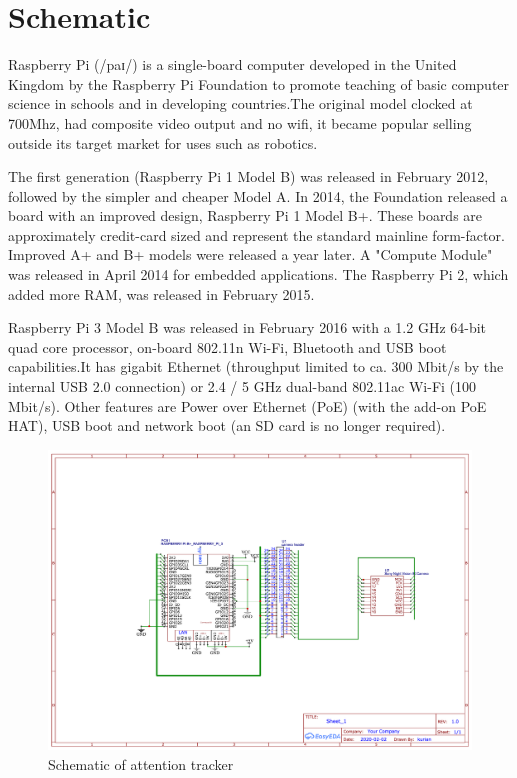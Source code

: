 \section{Schematic}

Raspberry Pi (/paɪ/) is a single-board computer developed in the United Kingdom by the Raspberry Pi Foundation to promote teaching of basic computer science in schools and in developing countries.The original model clocked at 700Mhz, had composite video output and no wifi, it became popular selling outside its target market for uses such as robotics. 

The first generation (Raspberry Pi 1 Model B) was released in February 2012, followed by the simpler and cheaper Model A. In 2014, the Foundation released a board with an improved design, Raspberry Pi 1 Model B+. These boards are approximately credit-card sized and represent the standard mainline form-factor. Improved A+ and B+ models were released a year later. A "Compute Module" was released in April 2014 for embedded applications. The Raspberry Pi 2, which added more RAM, was released in February 2015.

Raspberry Pi 3 Model B was released in February 2016 with a 1.2 GHz 64-bit quad core processor, on-board 802.11n Wi-Fi, Bluetooth and USB boot capabilities.It has gigabit Ethernet (throughput limited to ca. 300 Mbit/s by the internal USB 2.0 connection) or 2.4 / 5 GHz dual-band 802.11ac Wi-Fi (100 Mbit/s). Other features are Power over Ethernet (PoE) (with the add-on PoE HAT), USB boot and network boot (an SD card is no longer required).
\begin{figure}[ht]
\centering
\includegraphics[scale=0.15]{project}
\caption{Schematic of attention tracker}
\end{figure}
